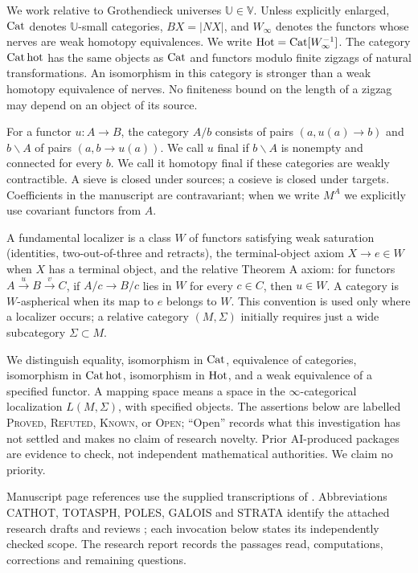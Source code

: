 We work relative to Grothendieck universes $\mathbb U\in\mathbb V$. Unless explicitly enlarged, $\mathrm{Cat}$ denotes $\mathbb U$-small categories, $BX=|NX|$, and $W_\infty$ denotes the functors whose nerves are weak homotopy equivalences. We write $\mathrm{Hot}=\mathrm{Cat}[W_\infty^{-1}]$. The category $\mathrm{Cat}\,\mathrm{hot}$ has the same objects as $\mathrm{Cat}$ and functors modulo finite zigzags of natural transformations. An isomorphism in this category is stronger than a weak homotopy equivalence of nerves. No finiteness bound on the length of a zigzag may depend on an object of its source.

For a functor $u:A\to B$, the category $A/b$ consists of pairs $(a,u(a)\to b)$ and $b\backslash A$ of pairs $(a,b\to u(a))$. We call $u$ final if $b\backslash A$ is nonempty and connected for every $b$. We call it homotopy final if these categories are weakly contractible. A sieve is closed under sources; a cosieve is closed under targets. Coefficients in the manuscript are contravariant; when we write $M^A$ we explicitly use covariant functors from $A$.

A fundamental localizer is a class $W$ of functors satisfying weak saturation (identities, two-out-of-three and retracts), the terminal-object axiom $X\to e\in W$ when $X$ has a terminal object, and the relative Theorem A axiom: for functors $A\xrightarrow u B\xrightarrow v C$, if $A/c\to B/c$ lies in $W$ for every $c\in C$, then $u\in W$. A category is $W$-aspherical when its map to $e$ belongs to $W$. This convention is used only where a localizer occurs; a relative category $(M,\Sigma)$ initially requires just a wide subcategory $\Sigma\subset M$.

We distinguish equality, isomorphism in $\mathrm{Cat}$, equivalence of categories, isomorphism in $\mathrm{Cat}\,\mathrm{hot}$, isomorphism in $\mathrm{Hot}$, and a weak equivalence of a specified functor. A mapping space means a space in the $\infty$-categorical localization $L(M,\Sigma)$, with specified objects. The assertions below are labelled \textsc{Proved}, \textsc{Refuted}, \textsc{Known}, or \textsc{Open}; ``Open'' records what this investigation has not settled and makes no claim of research novelty. Prior AI-produced packages are evidence to check, not independent mathematical authorities. We claim no priority.

Manuscript page references use the supplied transcriptions of \citet{GrothendieckPATHS}. Abbreviations CATHOT, TOTASPH, POLES, GALOIS and STRATA identify the attached research drafts and reviews \citep{SuppliedAuditsPATHS}; each invocation below states its independently checked scope. The research report records the passages read, computations, corrections and remaining questions.

